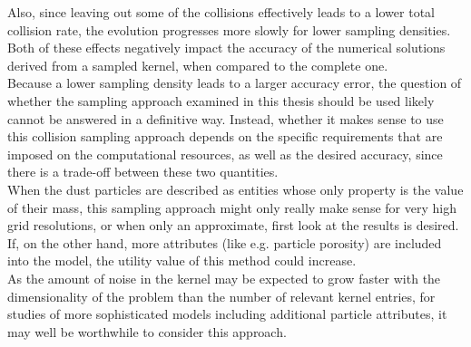 Also, since leaving out some of the collisions effectively leads to a 
lower total collision rate, the evolution progresses more slowly for lower sampling densities. \\

Both of these effects negatively impact the accuracy of the numerical solutions derived from a 
sampled kernel, when compared to the complete one. \\

Because a lower sampling density leads to a larger accuracy error, the question of whether the
sampling approach examined in this thesis should be used likely cannot be answered in a definitive 
way.
Instead, whether it makes sense to use this collision sampling approach depends on the specific 
requirements that are imposed on the computational resources, as well as the desired accuracy, 
since there is a trade-off between these two quantities. \\

When the dust particles are described as entities whose only 
property is the value of their mass, this sampling approach might only really make sense for very 
high grid resolutions, or when only an approximate, first look at the results is desired. \\

If, on the other hand, more attributes (like e.g. particle porosity) are included into the model, 
the utility value of this method could increase. \\

As the amount of noise in the kernel may be expected to grow faster with the dimensionality of the 
problem than the number of relevant kernel entries, for studies of more sophisticated models
including additional particle attributes, it may well be worthwhile to consider this approach.



